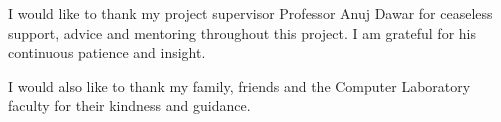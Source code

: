 
\begin{acknowledgements}      

I would like to thank my project supervisor Professor Anuj Dawar for ceaseless support, advice and mentoring throughout this project. I am grateful for his continuous  patience and insight.

I would also like to thank my family, friends and the Computer Laboratory faculty for their kindness and guidance.

\end{acknowledgements}
